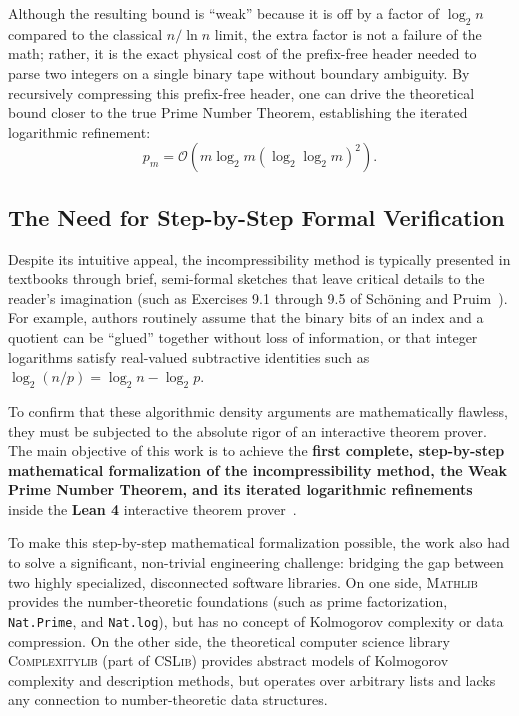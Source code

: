 \documentclass[acmsmall,natbib=false,nonacm]{acmart}
\begin{document}
Although the resulting bound is ``weak'' because it is off by a factor of $\log_2 n$ compared to the classical $n / \ln n$ limit, the extra factor is not a failure of the math; rather, it is the exact physical cost of the prefix-free header needed to parse two integers on a single binary tape without boundary ambiguity. By recursively compressing this prefix-free header, one can drive the theoretical bound closer to the true Prime Number Theorem, establishing the iterated logarithmic refinement:
\begin{equation}
    p_m = \mathcal{O}(m \log_2 m (\log_2 \log_2 m)^2).
\end{equation}

\subsection{The Need for Step-by-Step Formal Verification}
Despite its intuitive appeal, the incompressibility method is typically presented in textbooks through brief, semi-formal sketches that leave critical details to the reader's imagination (such as Exercises 9.1 through 9.5 of Sch\"{o}ning and Pruim~\cite{schoning1998gems}). For example, authors routinely assume that the binary bits of an index and a quotient can be ``glued'' together without loss of information, or that integer logarithms satisfy real-valued subtractive identities such as $\log_2 (n / p) = \log_2 n - \log_2 p$.

To confirm that these algorithmic density arguments are mathematically flawless, they must be subjected to the absolute rigor of an interactive theorem prover. The main objective of this work is to achieve the \textbf{first complete, step-by-step mathematical formalization of the incompressibility method, the Weak Prime Number Theorem, and its iterated logarithmic refinements} inside the \textbf{Lean 4} interactive theorem prover~\cite{moura2021lean}.

To make this step-by-step mathematical formalization possible, the work also had to solve a significant, non-trivial engineering challenge: bridging the gap between two highly specialized, disconnected software libraries. On one side, \textsc{Mathlib}~\cite{mathlib2020} provides the number-theoretic foundations (such as prime factorization, \texttt{Nat.Prime}, and \texttt{Nat.log}), but has no concept of Kolmogorov complexity or data compression. On the other side, the theoretical computer science library \textsc{Complexitylib} (part of \textsc{CSLib}) provides abstract models of Kolmogorov complexity and description methods, but operates over arbitrary lists and lacks any connection to number-theoretic data structures.
\end{document}
